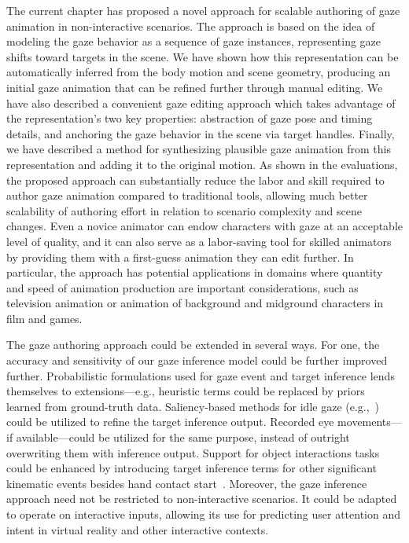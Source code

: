 The current chapter has proposed a novel approach for scalable authoring of gaze animation in non-interactive scenarios. The approach is based on the idea of modeling the gaze behavior as a sequence of gaze instances, representing gaze shifts toward targets in the scene. We have shown how this representation can be automatically inferred from the body motion and scene geometry, producing an initial gaze animation that can be refined further through manual editing. We have also described a convenient gaze editing approach which takes advantage of the representation's two key properties: abstraction of gaze pose and timing details, and anchoring the gaze behavior in the scene via target handles. Finally, we have described a method for synthesizing plausible gaze animation from this representation and adding it to the original motion. As shown in the evaluations, the proposed approach can substantially reduce the labor and skill required to author gaze animation compared to traditional tools, allowing much better scalability of authoring effort in relation to scenario complexity and scene changes. Even a novice animator can endow characters with gaze at an acceptable level of quality, and it can also serve as a labor-saving tool for skilled animators by providing them with a first-guess animation they can edit further. In particular, the approach has potential applications in domains where quantity and speed of animation production are important considerations, such as television animation or animation of background and midground characters in film and games.

The gaze authoring approach could be extended in several ways.
For one, the accuracy and sensitivity of our gaze inference model could be further improved further.
Probabilistic formulations used for gaze event and target inference lends themselves to extensions---e.g., heuristic terms could be replaced by priors learned from ground-truth data. Saliency-based methods for idle gaze (e.g.,~\cite{peters2003bottomup}) could be utilized to refine the target inference output. Recorded eye movements---if available---could be utilized for the same purpose, instead of outright overwriting them with inference output. Support for object interactions tasks could be enhanced by introducing target inference terms for other significant kinematic events besides hand contact start~\cite{johansson2001eyehead}.
Moreover, the gaze inference approach need not be restricted to non-interactive scenarios. It could be adapted to operate on interactive inputs, allowing its use for predicting user attention and intent in virtual reality and other interactive contexts.

